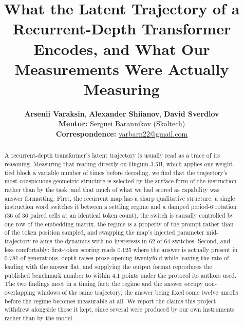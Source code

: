 \documentclass{zapiski}
\date{}
\begin{document}
\title[Latent Trajectories in Recurrent Depth]{What the Latent
Trajectory of a Recurrent-Depth Transformer Encodes, and What Our Measurements Were Actually
Measuring}

\author[Varaksin, Shiianov, Sverdlov]{
  \textbf{Arsenii Varaksin},
  \textbf{Alexander Shiianov},
  \textbf{David Sverdlov}
\\
  \small{
    \textbf{Mentor:} Serguei Barannikov (Skoltech)
  }
\\
  \small{
    \textbf{Correspondence:} \href{mailto:varbarn22@gmail.com}{varbarn22@gmail.com}
  }
}

\begin{abstract}
A recurrent-depth transformer's latent trajectory is usually read as a trace of its reasoning.
Measuring that reading directly on Huginn-3.5B, which applies one weight-tied block a variable
number of times before decoding, we find that the trajectory's most conspicuous geometric
structure is selected by the surface form of the instruction rather than by the task, and that
much of what we had scored as capability was answer formatting. First, the recurrent map has a
sharp qualitative structure: a single instruction word switches it between a settling regime and a
damped period-6 rotation (36 of 36 paired cells at an identical token count), the switch is
causally controlled by one row of the embedding matrix, the regime is a property of the prompt
rather than of the token position sampled, and swapping the map's injected parameter
mid-trajectory re-aims the dynamics with no hysteresis in 62 of 64 switches. Second, and less
comfortably: first-token scoring reads 0.125 where the answer is actually present in 0.781 of
generations, depth raises prose-opening twentyfold while leaving the rate of leading with the
answer flat, and supplying the output format reproduces the published benchmark number to within
4.1 points under the protocol its authors used. The two findings meet in a timing fact: the regime
and the answer occupy non-overlapping windows of the same trajectory, the answer being fixed some
twelve unrolls before the regime becomes measurable at all. We report the claims this project
withdrew alongside those it kept, since several were produced by our own instruments rather than
by the model.
\end{abstract}


\maketitle
\end{document}

